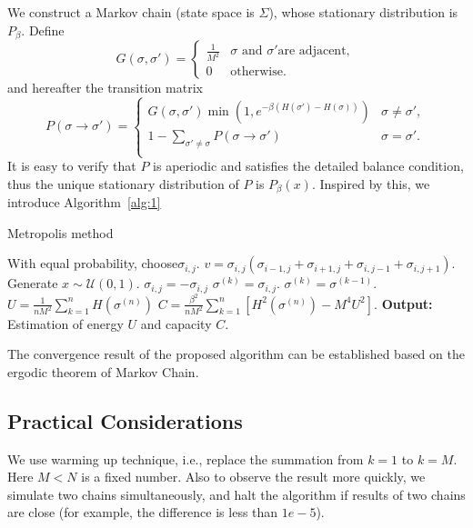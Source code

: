 \documentclass{article}
\begin{document}
We construct a Markov chain (state space is $\Sigma$), whose stationary distribution is $P_\beta$.  
 Define 
\begin{equation}
G(\sigma,\sigma')=\left\{\begin{array}{ll}
\frac{1}{M^2} & \sigma \text{ and }\sigma'\text{are adjacent},\\
0 & \text{otherwise}.
\end{array}\right.
\end{equation}
and hereafter the transition matrix
\begin{equation}
P(\sigma\to \sigma') = \left\{\begin{array}{ll}
G(\sigma,\sigma')\min(1,e^{-\beta(H(\sigma')-H(\sigma))}) & \sigma\neq \sigma', \\
1-\sum_{\sigma'\neq \sigma}P(\sigma\to\sigma') & \sigma= \sigma'. \\
\end{array}\right.
\end{equation}
It is easy to verify that $P$ is aperiodic and satisfies the detailed balance condition, thus the unique stationary distribution of $P$ is $P_\beta(x)$. Inspired by this, we introduce Algorithm~\ref{alg:1}

\begin{algorithm}[htbp]
	\caption{Metropolis method}
	\label{alg:1}
	\begin{algorithmic}
		\STATE With equal probability, choose$\sigma_{i,j}$. 
		\STATE $v = \sigma_{i,j}(\sigma_{i-1,j}+\sigma_{i+1,j}+\sigma_{i,j-1}+\sigma_{i,j+1}).$
		\STATE Generate $x \sim \mathcal U(0,1)$.
		\STATE $\sigma_{i,j} = -\sigma_{i,j}$
		\STATE $\sigma^{(k)} = \sigma_{i,j}$.
		\ELSE
		\STATE $\sigma^{(k)}=\sigma^{(k-1)}$.
		\ENDIF
		\ENDFOR
		\STATE $U =\frac{1}{nM^2}\sum_{k=1}^n H(\sigma^{(n)})$
		\STATE $C=\frac{\beta^2}{nM^2}\sum_{k=1}^n [H^2(\sigma^{(n)})-M^4U^2]$.
		\STATE \textbf{Output:} Estimation of energy $U$ and capacity $C$.
	\end{algorithmic}
\end{algorithm}

The convergence result of the proposed algorithm can be established based on the ergodic theorem of Markov Chain. 
\subsection{Practical Considerations}
We use warming up technique, i.e., replace the summation from $k=1$ to $k=M$. Here $M<N$ is a fixed number. 
Also to observe the result more quickly, we simulate two chains simultaneously, and halt the algorithm if results of two chains are close (for example, the difference is less than $1e-5$).
\end{document}
